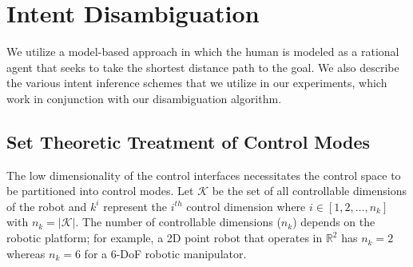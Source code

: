 \documentclass[letterpaper, 10 pt, conference]{ieeeconf}  %
\begin{document}
\section{Intent Disambiguation}\label{sec:disamb}
 We utilize a model-based approach in which the human is modeled as a rational agent that seeks to take the shortest distance path to the goal. 
We also describe the various intent inference schemes that we utilize in our experiments, which work in conjunction with our disambiguation algorithm. 


\subsection{Set Theoretic Treatment of Control Modes}\label{ssec:set_modes}
%
The low dimensionality of the control interfaces necessitates the control space to be partitioned into control modes.
Let $\mathcal{K}$ be the set of all controllable dimensions of the robot and $k^i$ represent the $i^{th}$ control dimension where $i \in [1,2,\dots,n_k]$ with $n_k = \vert\mathcal{K}\vert$. The number of controllable dimensions ($n_k$) depends on the robotic platform; for example, a 2D point robot that operates in $\mathbb{R}^2$ has $n_k = 2$ whereas $n_k =6$ for a 6-DoF robotic manipulator. 
\end{document}

